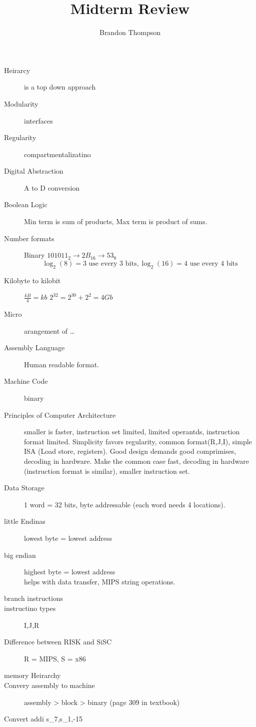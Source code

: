 \documentclass[a4paper]{article}
\begin{document}
\author{Brandon Thompson}
\title{Midterm Review}
\maketitle
\medskip
	\begin{description}
		\item[Heirarcy] is a top down approach
		\item[Modularity] interfaces
		\item[Regularity] compartmentalizatino
		\item[Digital Abstraction] A to D conversion
		\item[Boolean Logic] Min term is sum of products, Max term is product of sums.
		\item[Number formats] Binary $101011_2 \to 2B_{16} \to 53_8$
			\begin{equation}
				\log_2(8)=3 \text{ use every 3 bits}, \log_2(16)=4 \text{ use every 4 bits}
			\end{equation}
		\item[Kilobyte to kilobit] $\frac{kB}{4}=kb$  $2^{32} = 2^{30}+2^2 = 4Gb$ 
		\item[Micro] arangement of \ldots 
		\item[Assembly Language] Human readable format.
		\item[Machine Code] binary
		\item[Principles of Computer Architecture] smaller is faster, instruction set limited, limited
			operantds, instruction format limited. Simplicity favors regularity, common format(R,J,I),
			simple ISA (Load store, registers). Good design demands good comprimises, decoding in hardware.
			Make the common case fast, decoding in hardware (instruction format is similar), smaller
			instruction set.
		\item[Data Storage] 1 word = 32 bits, byte addressable (each word needs 4 locations).
		\item[little Endinas] lowest byte = lowest address
		\item[big endian] highest byte = lowest address\\
			helps with data transfer, MIPS string operations.
		\item[branch instructions] 
		\item[instructino types] I,J,R
		\item[Difference between RISK and SiSC] R = MIPS, S = x86
		\item[memory Heirarchy]
		\item[Convery assembly to machine] assembly > block > binary (page 309 in textbook)
	\end{description}
	
	\*
	Convert  addi s_7,s_1,-15
	\begin{center}
		
	\end{center}
\end{document}
